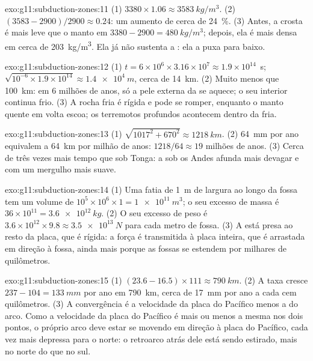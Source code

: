 \begin{solution}{exo:g11:subduction-zones:11}
(1) $3380 \times 1.06 \approx \qty{3583}{kg/m^3}$. (2)
$(3583 - 2900)/2900 \approx 0.24$: um aumento de cerca de \qty{24}{\percent}.
(3) Antes, a crosta é mais leve que o manto em
$3380 - 2900 = \qty{480}{kg/m^3}$; depois, ela é mais densa em cerca de
\qty{203}{kg/m^3}. Ela já não sustenta a : ela a puxa para baixo.
\end{solution}

\begin{solution}{exo:g11:subduction-zones:12}
(1) $t = 6 \times 10^6 \times 3.16 \times 10^7 \approx 1.9 \times 10^{14}$~s;
$\sqrt{10^{-6} \times 1.9 \times 10^{14}} \approx \qty{1.4e4}{m}$, cerca de
\qty{14}{km}. (2) Muito menos que \qty{100}{km}: em 6 milhões de anos, só a
pele externa da  se aquece; o seu interior continua frio. (3) A rocha
fria é rígida e pode se romper, enquanto o manto quente em volta escoa; os
terremotos profundos acontecem dentro da  fria.
\end{solution}

\begin{solution}{exo:g11:subduction-zones:13}
(1) $\sqrt{1017^2 + 670^2} \approx \qty{1218}{km}$. (2) \qty{64}{mm} por ano
equivalem a \qty{64}{km} por milhão de anos: $1218/64 \approx 19$ milhões de
anos. (3) Cerca de três vezes mais tempo que sob Tonga: a  sob os Andes
afunda mais devagar e com um mergulho mais suave.
\end{solution}

\begin{solution}{exo:g11:subduction-zones:14}
(1) Uma fatia de \qty{1}{m} de largura ao longo da fossa tem um volume de
$10^5 \times 10^6 \times 1 = \qty{1e11}{m^3}$; o seu excesso de massa é
$36 \times 10^{11} = \qty{3.6e12}{kg}$. (2) O seu excesso de peso é
$3.6 \times 10^{12} \times 9.8 \approx \qty{3.5e13}{N}$ para cada metro de
fossa. (3) A  está presa ao resto da placa, que é rígida: a força é
transmitida à placa inteira, que é arrastada em direção à fossa, ainda mais
porque as fossas se estendem por milhares de quilômetros.
\end{solution}

\begin{solution}{exo:g11:subduction-zones:15}
(1) $(23.6 - 16.5) \times 111 \approx \qty{790}{km}$. (2) A taxa cresce
$237 - 104 = \qty{133}{mm}$ por ano em \qty{790}{km}, cerca de \qty{17}{mm}
por ano a cada cem quilômetros. (3) A convergência é a velocidade da placa
do Pacífico menos a do arco. Como a velocidade da placa do Pacífico é mais
ou menos a mesma nos dois pontos, o próprio arco deve estar se movendo em
direção à placa do Pacífico, cada vez mais depressa para o norte: o
retroarco atrás dele está sendo estirado, mais no norte do que no sul.
\end{solution}

